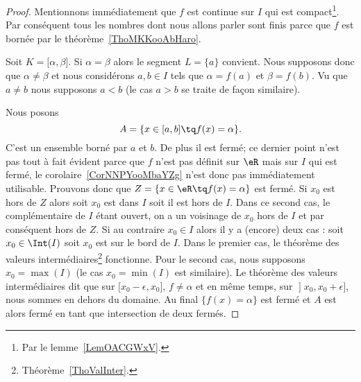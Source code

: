 \begin{proof}
    Mentionnons immédiatement que \( f\) est continue sur \( I\) qui est compact\footnote{Par le lemme~\ref{LemOACGWxV}.}. Par conséquent tous les nombres dont nous allons parler sont finis parce que \( f\) est bornée par le théorème~\ref{ThoMKKooAbHaro}.

    Soit \( K=\mathopen[ \alpha , \beta \mathclose]\). Si \( \alpha=\beta\) alors le segment \( L=\{ a \}\) convient. Nous supposons donc que \( \alpha\neq \beta\) et nous considérons \( a,b\in I\) tels que \( \alpha=f(a)\) et \( \beta=f(b)\). Vu que \( a\neq b\) nous supposons \( a<b\) (le cas \( a>b\) se traite de façon similaire).

    Nous posons
    \begin{equation}
        A=\{ x\in\mathopen[ a , b \mathclose]\tq f(x)=\alpha \}.
    \end{equation}
    C'est un ensemble borné par \( a\) et \( b\). De plus il est fermé; ce dernier point n'est pas tout à fait évident parce que \( f\) n'est pas définit sur \( \eR\) mais sur \( I\) qui est fermé, le corolaire~\ref{CorNNPYooMbaYZg} n'est donc pas immédiatement utilisable. Prouvons donc que \( Z=\{ x\in \eR\tq f(x)=\alpha \}\) est fermé. Si \( x_0\) est hors de \( Z\) alors soit \( x_0\) est dans \( I\) soit il est hors de \( I\). Dans ce second cas, le complémentaire de \( I\) étant ouvert, on a un voisinage de \( x_0\) hors de \( I\) et par conséquent hors de \( Z\). Si au contraire \( x_0\in I\) alors il y a (encore) deux cas : soit \( x_0\in\Int(I)\) soit \( x_0\) est sur le bord de \( I\). Dans le premier cas, le théorème des valeurs intermédiaires\footnote{Théorème~\ref{ThoValInter}.} fonctionne. Pour le second cas, nous supposons \( x_0=\max(I)\) (le cas \( x_0=\min(I)\) est similaire). Le théorème des valeurs intermédiaires dit que sur \( \mathopen[ x_0-\epsilon , x_0 \mathclose]\), \( f\neq \alpha\) et en même temps, sur \( \mathopen] x_0 , x_0+\epsilon \mathclose]\), nous sommes en dehors du domaine. Au final \( \{ f(x)=\alpha \}\) est fermé et \( A\) est alors fermé en tant que intersection de deux fermés.


\end{proof}
